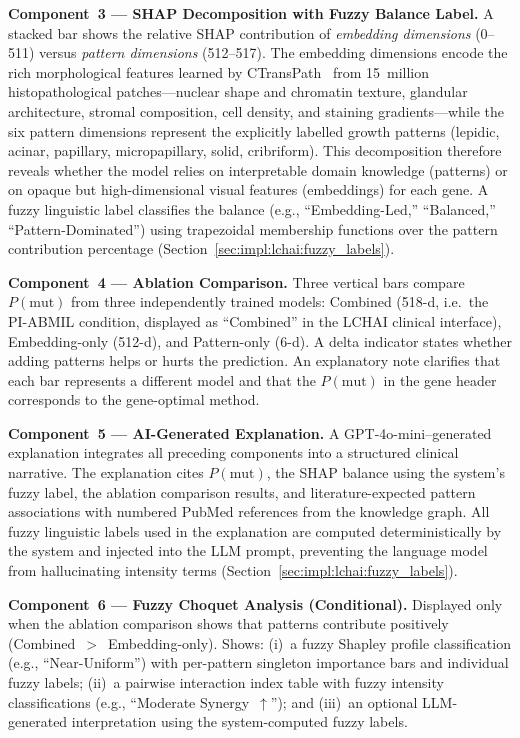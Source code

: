 \textbf{Component~3 --- SHAP Decomposition with Fuzzy Balance Label.}
A stacked bar shows the relative SHAP contribution of
\emph{embedding dimensions} (0--511) versus
\emph{pattern dimensions} (512--517).
The embedding dimensions encode the rich morphological features
learned by CTransPath~\cite{wang2022ctranspath} from 15~million histopathological patches---nuclear
shape and chromatin texture, glandular architecture, stromal composition,
cell density, and staining gradients---while the six pattern dimensions
represent the explicitly labelled growth patterns
(lepidic, acinar, papillary, micropapillary, solid, cribriform).
This decomposition therefore reveals whether the model relies on
interpretable domain knowledge (patterns) or on opaque but
high-dimensional visual features (embeddings) for each gene.
A fuzzy linguistic label classifies the balance (e.g., ``Embedding-Led,'' ``Balanced,'' ``Pattern-Dominated'') using trapezoidal membership functions over the pattern contribution percentage (Section~\ref{sec:impl:lchai:fuzzy_labels}).

\textbf{Component~4 --- Ablation Comparison.}
Three vertical bars compare $P(\text{mut})$ from three independently trained models: Combined (518-d, i.e.\ the PI-ABMIL condition, displayed as ``Combined'' in the LCHAI clinical interface), Embedding-only (512-d), and Pattern-only (6-d).
A delta indicator states whether adding patterns helps or hurts the prediction.
An explanatory note clarifies that each bar represents a different model and that the $P(\text{mut})$ in the gene header corresponds to the gene-optimal method.

\textbf{Component~5 --- AI-Generated Explanation.}
A GPT-4o-mini--generated explanation integrates all preceding components into a structured clinical narrative.
The explanation cites $P(\text{mut})$, the SHAP balance using the system's fuzzy label, the ablation comparison results, and literature-expected pattern associations with numbered PubMed references from the knowledge graph.
All fuzzy linguistic labels used in the explanation are computed deterministically by the system and injected into the LLM prompt, preventing the language model from hallucinating intensity terms (Section~\ref{sec:impl:lchai:fuzzy_labels}).

\textbf{Component~6 --- Fuzzy Choquet Analysis (Conditional).}
Displayed only when the ablation comparison shows that patterns contribute positively (Combined~$>$~Embedding-only).
Shows: (i)~a fuzzy Shapley profile classification (e.g., ``Near-Uniform'') with per-pattern singleton importance bars and individual fuzzy labels; (ii)~a pairwise interaction index table with fuzzy intensity classifications (e.g., ``Moderate Synergy~$\uparrow$''); and (iii)~an optional LLM-generated interpretation using the system-computed fuzzy labels.


